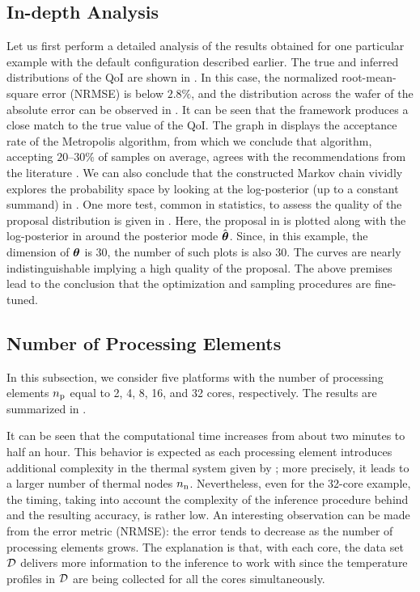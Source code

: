 \subsection{In-depth Analysis}



Let us first perform a detailed analysis of the results obtained for one particular example with the default configuration described earlier. The true and inferred distributions of the QoI are shown in . In this case, the normalized root-mean-square error (NRMSE) is below $2.8\%$, and the distribution across the wafer of the absolute error can be observed in . It can be seen that the framework produces a close match to the true value of the QoI. The graph in  displays the acceptance rate of the Metropolis algorithm, from which we conclude that algorithm, accepting $20$--$30\%$ of samples on average, agrees with the recommendations from the literature \cite{gelman2004}. We can also conclude that the constructed Markov chain vividly explores the probability space by looking at the log-posterior (up to a constant summand) in . One more test, common in statistics, to assess the quality of the proposal distribution is given in . Here, the proposal in  is plotted along with the log-posterior in  around the posterior mode $\hat{{\boldsymbol\theta}}$. Since, in this example, the dimension of ${\boldsymbol\theta}$ is 30, the number of such plots is also 30. The curves are nearly indistinguishable implying a high quality of the proposal. The above premises lead to the conclusion that the optimization and sampling procedures are fine-tuned.

\subsection{Number of Processing Elements}
In this subsection, we consider five platforms with the number of processing elements ${n_\text{p}}$ equal to 2, 4, 8, 16, and 32 cores, respectively. The results are summarized in .


It can be seen that the computational time increases from about two minutes to half an hour. This behavior is expected as each processing element introduces additional complexity in the thermal system given by ; more precisely, it leads to a larger number of thermal nodes ${n_\text{n}}$. Nevertheless, even for the 32-core example, the timing, taking into account the complexity of the inference procedure behind and the resulting accuracy, is rather low. An interesting observation can be made from the error metric (NRMSE): the error tends to decrease as the number of processing elements grows. The explanation is that, with each core, the data set $\mathcal{D}$ delivers more information to the inference to work with since the temperature profiles in $\mathcal{D}$ are being collected for all the cores simultaneously.

